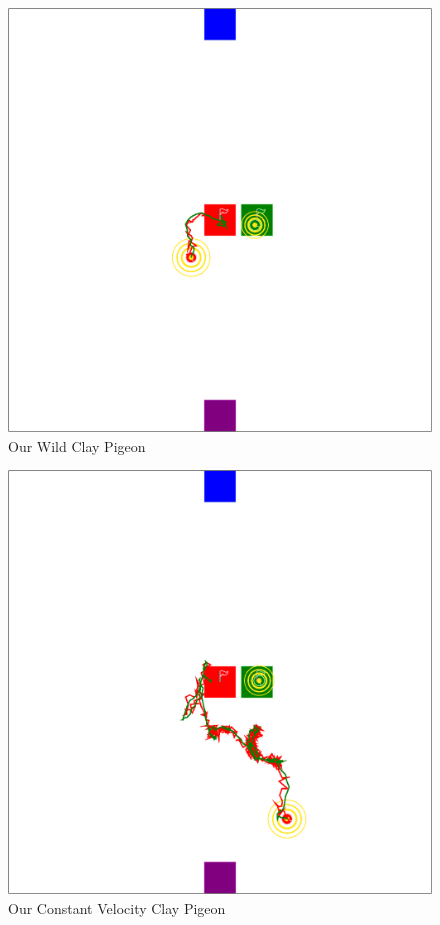 \begin{figure}
   \begin{center}
   	\includegraphics[width=\textwidth]{kalman-path-wild1.png}
   \end{center}
   \caption{Our Wild Clay Pigeon}
  \end{figure}
\begin{figure}
   \begin{center}
   	\includegraphics[width=\textwidth]{kalman-path-wild2.png}
   \end{center}
   \caption{Our Constant Velocity Clay Pigeon}
  \end{figure}
